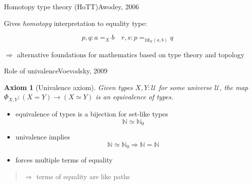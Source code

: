 \documentclass[english,draft]{beamer}
\newtheorem{axiom}[theorem]{Axiom}
\begin{document}
\begin{frame}{Homotopy type theory (HoTT)}{Awodey, 2006}

Gives \emph{homotopy} interpretation to equality type:

\centering
$$ p,q : a =_X b \quad r,s : p =_{\texttt{Id}_X(a,b)} q$$ 




$\Rightarrow$ alternative foundations for mathematics based on type theory and topology

\end{frame}






\begin{frame}{Role of univalence}{Voevodsky, 2009}

\begin{axiom}[Univalence axiom] 
 Given types $X,Y : \mathcal{U}$ for some universe $\mathcal{U}$, the map \(\Phi_{X,Y}: (X=Y) \rightarrow (X \simeq Y)\) is an equivalence of types. 
\end{axiom}

\begin{itemize}
    \item equivalence of types is a bijection for set-like types \[\mathbb{N} \simeq \mathbb{N}_0 \]
    \item univalence implies \[\mathbb{N} \simeq \mathbb{N}_0 \Rightarrow \mathbb{N} = \mathbb{N}\]

    \item forces multiple terms of equality
\end{itemize}

\pause
\begin{quotation}
$\Rightarrow$ terms of equality are like paths
\end{quotation}



\end{frame}
\end{document}

